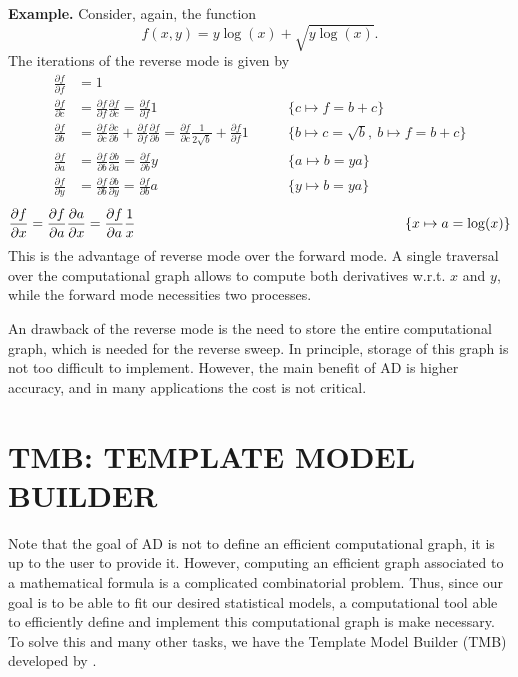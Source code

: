 \noindent\textbf{Example.}\hspace{.5cm}
Consider, again, the function
\[
  f(x, y) = y\log(x) + \sqrt{y\log(x)}.
\]
The iterations of the reverse mode is given by
\begin{align*}
  \frac{\partial f}{\partial f} &= 1\\
  \frac{\partial f}{\partial c} &=
  \frac{\partial f}{\partial f} \frac{\partial f}{\partial c} =
  \frac{\partial f}{\partial f} 1\qquad &\{c \mapsto f = b + c\}\\
  \frac{\partial f}{\partial b} &=
  \frac{\partial f}{\partial c} \frac{\partial c}{\partial b} +
  \frac{\partial f}{\partial f} \frac{\partial f}{\partial b} =
  \frac{\partial f}{\partial c} \frac{1}{2\sqrt{b}} +
  \frac{\partial f}{\partial f} 1\qquad
  &\{b \mapsto c = \sqrt{b},~b \mapsto f = b + c\}\\
  \frac{\partial f}{\partial a} &=
  \frac{\partial f}{\partial b} \frac{\partial b}{\partial a} =
  \frac{\partial f}{\partial b} y\qquad &\{a \mapsto b = ya\}\\
  \frac{\partial f}{\partial y} &=
  \frac{\partial f}{\partial b} \frac{\partial b}{\partial y} =
  \frac{\partial f}{\partial b} a \qquad &\{y \mapsto b = ya\}
\end{align*}
\begin{align*}
  \frac{\partial f}{\partial x} &=
  \frac{\partial f}{\partial a} \frac{\partial a}{\partial x} =
  \frac{\partial f}{\partial a} \frac{1}{x} \hspace{6.5cm}
  &\{x \mapsto a = \log(x)\}
\end{align*}
This is the advantage of reverse mode over the forward mode. A single
traversal over the computational graph allows to compute both
derivatives w.r.t. \(x\) and \(y\), while the forward mode necessities
two processes.

An drawback of the reverse mode is the need to store the entire
computational graph, which is needed for the reverse sweep. In
principle, storage of this graph is not too difficult to implement.
However, the main benefit of AD is higher accuracy, and in many
applications the cost is not critical.

\section{TMB: TEMPLATE MODEL BUILDER}
\label{cap:tmb}

Note that the goal of AD is not to define an efficient computational
graph, it is up to the user to provide it. However, computing an
efficient graph associated to a mathematical formula is a complicated
combinatorial problem. Thus, since our goal is to be able to fit our
desired statistical models, a computational tool able to efficiently
define and implement this computational graph is make necessary. To
solve this and many other tasks, we have the Template Model Builder
(TMB) developed by .

